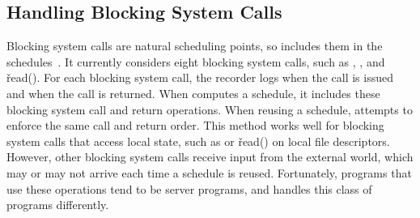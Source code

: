 




\subsection{Handling Blocking System Calls}

Blocking system calls are natural scheduling points, so \peregrine includes them
in the schedules~\cite{cui:tern:osdi10}.  It currently considers eight
blocking system calls, %
such as ,
, and \v{read()}.  For each blocking system call, the recorder
logs when the call is issued and when the call is returned.  When \peregrine
computes a schedule, it includes these blocking system call and return
operations.  When reusing a schedule, \peregrine attempts to enforce the same
call and return order.  This method works well for blocking system calls
that access local state, such as  or \v{read()} on local file
descriptors.  However, other blocking system calls receive input from
the external world, which may or may not arrive each time a
schedule is reused.  Fortunately, programs that use these operations tend to be
server programs, and \peregrine handles this class of programs differently.

